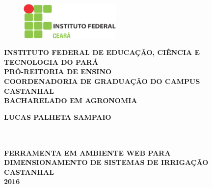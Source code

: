 \thispagestyle{empty}

\vfill
 \begin{center}
    \begin{figure}[t]
     \centering
            \includegraphics[width=5cm]{figures/IF_logo.eps}\\[-0.1in]
     \end{figure}

    {\large\bfseries INSTITUTO FEDERAL DE EDUCAÇÃO, CIÊNCIA E TECNOLOGIA DO PARÁ} \\
    {\large\bfseries PRÓ-REITORIA DE ENSINO} \\
    {\large\bfseries COORDENADORIA DE GRADUAÇÃO DO CAMPUS CASTANHAL}  \\ 
    {\large\bfseries BACHARELADO EM AGRONOMIA}  \\ 

    \vspace*{1in}
    \begin{large} \bfseries LUCAS PALHETA SAMPAIO \end{large}\\[0.4in]

    \vspace*{4cm}
    \noindent \\
    \large\bfseries{FERRAMENTA EM AMBIENTE WEB PARA DIMENSIONAMENTO DE SISTEMAS DE IRRIGAÇÃO} \\
    \vfill
    \large\bfseries{ CASTANHAL \\ 2016}
\end{center}

\normalsize